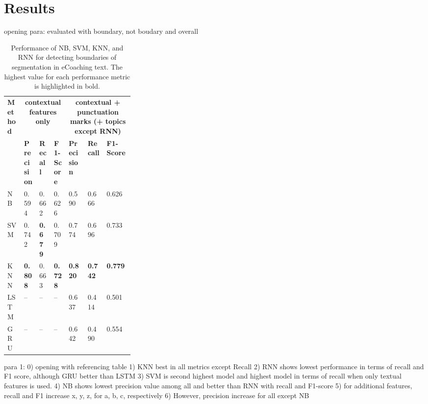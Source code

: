 \documentclass{amia}
\begin{document}
\section*{Results}
opening para: evaluated with boundary, not boudary and overall \\

\begin{table}[ht]
\centering
\caption{Performance of NB, SVM, KNN, and RNN for detecting boundaries of segmentation in eCoaching text. The highest value for each performance metric is highlighted in bold.}
\label{tab:result_boundary}
  \begin{tabular}{|l|l|l|l|p{0.15\linewidth}|p{0.15\linewidth}|l|}
  \hline
   \multirow{2}{*}{\textbf{Method}} & \multicolumn{3}{|c|}{\textbf{contextual features only}} & \multicolumn{3}{|c|}{\textbf{contextual + punctuation marks (+ topics except RNN)}} \\\cline{2-7}
   & \textbf{Precision}  & \textbf{Recall} & \textbf{F1-Score} & \textbf{Precision}  & \textbf{Recall} & \textbf{F1-Score}\\ \hline    
    
 NB & 0.594 & 0.662 & 0.626 & 0.590 & 0.666 & 0.626 \\ \hline
 SVM & 0.742 & \textbf{0.679} & 0.709 & 0.774 & 0.696 & 0.733\\ \hline
 KNN & \textbf{0.808} & 0.663 & \textbf{0.728} & \textbf{0.820} & \textbf{0.742} & \textbf{0.779}\\ \hline
 LSTM & -- & -- & -- & 0.637 & 0.414 & 0.501  \\ \hline
 GRU & -- & -- & -- & 0.642 & 0.490 & 0.554 \\ \hline 
  \end{tabular}
\end{table} 

para 1:
0) opening with referencing table
1) KNN best in all metrics except Recall
2) RNN shows lowest performance in terms of recall and F1 score, although GRU better than LSTM 
3) SVM is second highest model and highest model in terms of recall when only textual features is used.
4) NB shows lowest precision value among all and better than RNN with recall and F1-score
5) for additional features, recall and F1 increase x, y, z, for a, b, c, respectively
6) However, precision increase for all except NB \\
\end{document}
